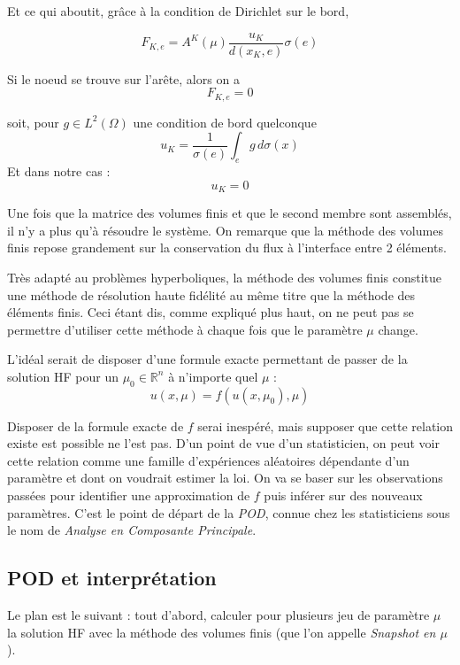 \documentclass[12pt,a4paper,article]{memoir} %
\begin{document}
Et ce qui aboutit, grâce à la condition de Dirichlet sur le bord, 

\[
    F_{K,e} = A^{K}(\mu)\frac{u_K}{d(x_K, e)}\sigma(e)
\]

Si le noeud se trouve sur l'arête, alors on a 
\[
    F_{K,e} = 0
\]

soit, pour $g \in L^2(\Omega)$ une condition de bord quelconque
\[
u_K = \frac{1}{\sigma(e)}\int_{e}g \, d\sigma(x)
\] 
Et dans notre cas : 
\[
    u_K = 0
\]

Une fois que la matrice des volumes finis et que le second membre sont assemblés, il n'y a plus qu'à résoudre le système.
On remarque que la méthode des volumes finis repose grandement sur la conservation du flux à l'interface
entre 2 éléments.

\vspace{0.3cm}

Très adapté au problèmes hyperboliques, la méthode des volumes finis constitue une méthode de résolution haute fidélité
au même titre que la méthode des éléments finis. Ceci étant dis, comme expliqué plus haut, on ne peut pas
se permettre d'utiliser cette méthode à chaque fois que le paramètre $\mu$ change. 

\vspace{0.3cm}

L'idéal serait de disposer d'une formule exacte permettant de passer de la solution HF pour un $\mu_0 \in \mathbb{R}^n $ à
n'importe quel $\mu$ : 
\[
 u(x, \mu) = f(u(x,\mu_0), \mu)
\]

Disposer de la formule exacte de $f$ serai inespéré, mais supposer que cette relation existe est possible ne l'est pas. 
D'un point de vue d'un statisticien, on peut voir cette relation comme une famille d'expériences aléatoires dépendante
d'un paramètre et dont on voudrait estimer la loi. On va se baser sur les observations passées pour identifier une approximation de $f$
puis inférer sur des nouveaux paramètres. C'est le point de départ de la \textit{POD}, connue chez les statisticiens sous le nom de 
\textit{Analyse en Composante Principale}.

\subsection{POD et interprétation}

\vspace{0.2cm}

Le plan est le suivant : tout d'abord, calculer pour plusieurs jeu de paramètre $\mu$ la solution HF avec la méthode des volumes finis (que l'on appelle \textit{Snapshot en $\mu$}). 
\end{document}
